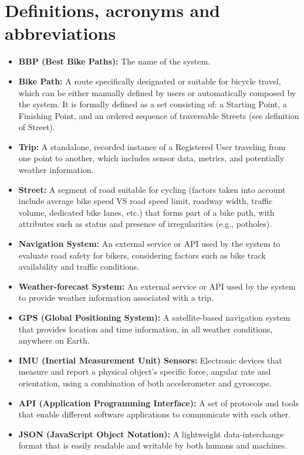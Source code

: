 \documentclass{Configuration_Files/PoliMi3i_thesis}
\begin{document}
\vfill

\section{Definitions, acronyms and abbreviations}

\begin{itemize}

    \item \textbf{BBP (Best Bike Paths):} The name of the system.
    \item \textbf{Bike Path:} A route specifically designated or suitable for bicycle travel, which can be either manually defined by users or automatically composed by the system. It is formally defined as a set consisting of: a Starting Point, a Finishing Point, and an ordered sequence of traversable Streets (see definition of Street).
    \item \textbf{Trip:} A standalone, recorded instance of a Registered User traveling from one point to another, which includes sensor data, metrics, and potentially weather information.
    \item \textbf{Street:} A segment of road suitable for cycling (factors taken into account include average bike speed VS road speed limit, roadway width, traffic volume, dedicated bike lanes, etc.) that forms part of a bike path, with attributes such as status and presence of irregularities (e.g., potholes).
    \item \textbf{Navigation System:} An external service or API used by the system to evaluate road safety for bikers, considering factors such as bike track availability and traffic conditions.
    \item \textbf{Weather-forecast System:} An external service or API used by the system to provide weather information associated with a trip.
    \item \textbf{GPS (Global Positioning System):} A satellite-based navigation system that provides location and time information, in all weather conditions, anywhere on Earth.
    \item \textbf{IMU (Inertial Measurement Unit) Sensors:} Electronic devices that measure and report a physical object's specific force, angular rate and orientation, using a combination of both accelerometer and gyroscope.
    \item \textbf{API (Application Programming Interface):} A set of protocols and tools that enable different software applications to communicate with each other.
    \item \textbf{JSON (JavaScript Object Notation):} A lightweight data-interchange format that is easily readable and writable by both humans and machines.

\end{itemize}
\end{document}
